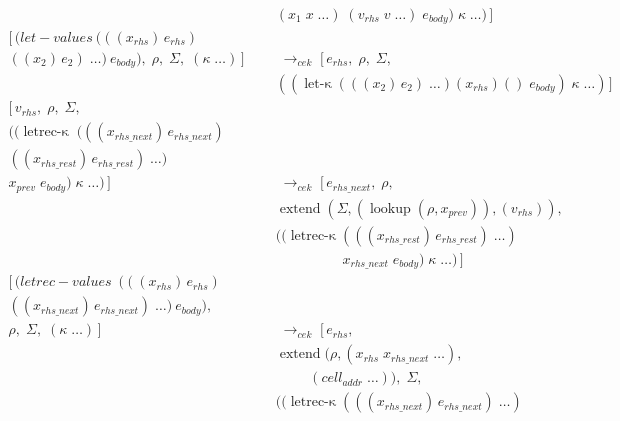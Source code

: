 \begin{figure}[!h]
{\begin{minipage}{\textwidth}
\begin{align*}
        & (x_1\;x\;\ldots)\;(v_{rhs}\;v\;\ldots)\;e_{body})\;\kappa\;\ldots)\,]\\
        [\,(let\!-\!values\ (((x_{rhs})\,e_{rhs}) \hspace{2cm} & \; \\
        ((x_2)\,e_2)\;\ldots)\ e_{body}),\;\rho,\;\Sigma,\;(\kappa\;\ldots)\,] &\;\longrightarrow_{\textit{cek}}\;
        [\,e_{rhs},\;\rho,\;\Sigma, \\
        & ((\operatorname{let-\kappa}(((x_2)\,e_2)\;\ldots)(x_{rhs})()\;e_{body})\;\kappa\;\ldots)\,]\\
        [\,v_{rhs},\;\rho,\;\Sigma, \hspace{4cm} \\
        ((\operatorname{letrec-\kappa}\; (((x_{rhs\_next})\,e_{rhs\_next}) \hspace{0cm} \\
        ((x_{rhs\_rest})\,e_{rhs\_rest})\;\ldots)\\ 
        x_{prev}\;e_{body})\;\kappa\;\ldots)\,] &\;\longrightarrow_{\textit{cek}}\;
        [\,e_{rhs\_next},\;\rho,\\
        & \operatorname{extend}(\Sigma,(\operatorname{lookup}(\rho,x_{prev})),(v_{rhs})),\\
        & ((\operatorname{letrec-\kappa}(((x_{rhs\_rest})\,e_{rhs\_rest})\;\ldots) \\
        & \hspace{2cm} x_{rhs\_next}\;e_{body})\;\kappa\;\ldots)\,] \\
        [\,(letrec\!-\!values\ \; (((x_{rhs})\,e_{rhs}) \hspace{1cm} & \; \\
        ((x_{rhs\_next})\,e_{rhs\_next})\;\ldots)\ e_{body}), & \; \\ 
        \rho,\;\Sigma,\;(\kappa\;\ldots)\,] &\;\longrightarrow_{\textit{cek}}\; [\,e_{rhs},\\
        & \operatorname{extend}(\rho,(x_{rhs}\;x_{rhs\_next}\;\ldots),\\
                & \hspace{1cm} (cell_{addr}\;\ldots)),\;\Sigma,\\
        & ((\operatorname{letrec-\kappa}(((x_{rhs\_next})\,e_{rhs\_next})\;\ldots)\\

\end{align*}
\end{minipage}}
\end{figure}
